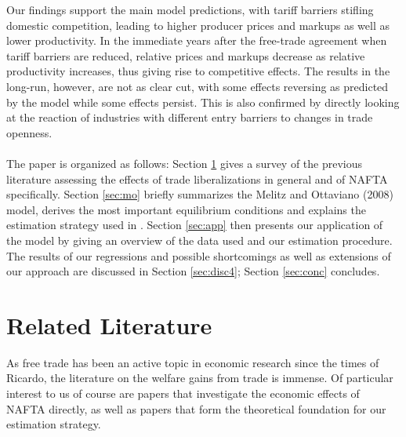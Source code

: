 Our findings support the main model predictions, with tariff barriers stifling domestic competition, leading to higher producer prices and markups as well as lower productivity. In the immediate years after the free-trade agreement when tariff barriers are reduced, relative prices and markups decrease as relative productivity increases, thus giving rise to competitive effects. The results in the long-run, however, are not as clear cut, with some effects reversing as predicted by the model while some effects persist. This is also confirmed by directly looking at the reaction of industries with different entry barriers to changes in trade openness. \\
\vspace{0.5cm} \\
The paper is organized as follows: Section \ref{sec:lit} gives a survey of the previous literature assessing the effects of trade liberalizations in general and of NAFTA specifically. Section \ref{sec:mo} briefly summarizes the Melitz and Ottaviano (2008) model, derives the most important equilibrium conditions and explains the estimation strategy used in \citet{Chen2009}. Section \ref{sec:app} then presents our application of the model by giving an overview of the data used and our estimation procedure. The results of our regressions and possible shortcomings as well as extensions of our approach are discussed in Section \ref{sec:disc4}; Section \ref{sec:conc} concludes.

\newpage


\section{Related Literature}\label{sec:lit}

As free trade has been an active topic in economic research since the times of Ricardo, the literature on the welfare gains from trade is immense. Of particular interest to us of course are papers that investigate the economic effects of NAFTA directly, as well as papers that form the theoretical foundation for our estimation strategy.

